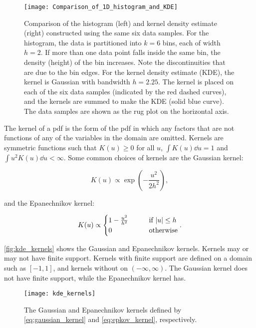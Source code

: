 \begin{figure}[!htb]
    \centering
    \texttt{[image: Comparison\_of\_1D\_histogram\_and\_KDE]}
    \caption{Comparison of the histogram (left) and kernel density estimate (right) constructed using the same six data samples. For the histogram, the data is partitioned into $k=6$ bins, each of width $h=2$. If more than one data point falls inside the same bin, the density (height) of the bin increases. Note the discontinuities that are due to the bin edges. For the kernel density estimate (KDE), the kernel is Gaussian with bandwidth $h=2.25$. The kernel is placed on each of the six data samples (indicated by the red dashed curves), and the kernels are summed to make the KDE (solid blue curve). The data samples are shown as the rug plot on the horizontal axis.
    }
    \label{fig:kde_figure}
\end{figure}


The kernel of a pdf is the form of the pdf in which any factors that are not functions of any of the variables in the domain are omitted. Kernels are symmetric functions such that $K(u) \geq 0$ for all $u$, $\int K(u) \dd{u}=1$ and $\int u^2 K(u) \dd{u} < \infty$. Some common choices of kernels are the Gaussian kernel:

\begin{equation}\label{eq:gaussian_kernel}
    K(u) \propto \exp(- \frac{u^2}{2h^2}),
\end{equation}

and the Epanechnikov kernel:

\begin{equation}\label{eq:epkov_kernel}
    K (u) \propto \begin{cases} 
    1 - \frac{u^2}{h^2} \qquad &\text{if } \abs{u} \leq h 
    \\
    0 \qquad &\text{otherwise}
    \end{cases}.
\end{equation}

\autoref{fig:kde_kernels} shows the Gaussian and Epanechnikov kernels. Kernels may or may not have finite support. Kernels with finite support are defined on a domain such as $[-1, 1]$, and kernels without on $(-\infty, \infty)$. The Gaussian kernel does not have finite support, while the Epanechnikov kernel has. 

\begin{figure}[!htb]
    \centering
    \texttt{[image: kde\_kernels]}
    \caption{The Gaussian and Epanechnikov kernels defined by \autoref{eq:gaussian_kernel} and \autoref{eq:epkov_kernel}, respectively.
    }
    \label{fig:kde_kernels}
\end{figure}

